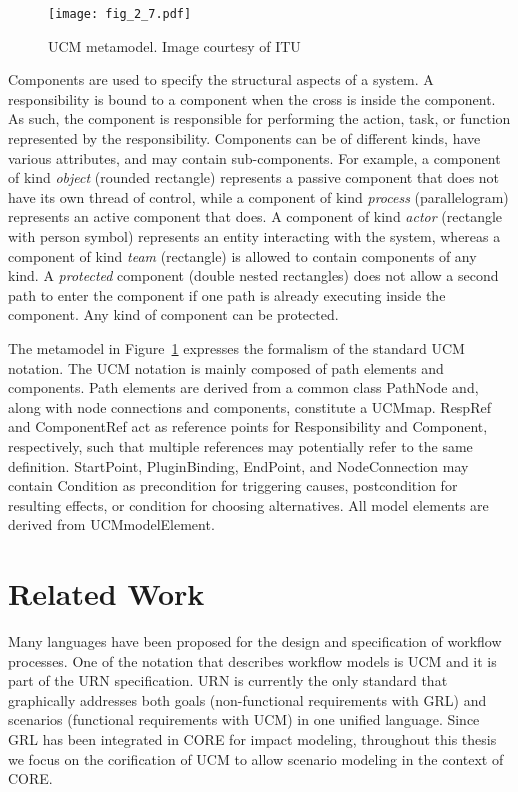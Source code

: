 \begin{figure}
	\centering
	\texttt{[image: fig\_2\_7.pdf]}
	\caption[UCM metamodel]{UCM metamodel. Image courtesy of ITU~\cite{itu2012151}}
	\label{fig:2.7}
\end{figure}

Components are used to specify the structural aspects of a system. A responsibility is bound to a component when the cross is inside the component. As such, the component is responsible for performing the action, task, or function represented by the responsibility. Components can be of different kinds, have various attributes, and may contain sub-components. For example, a component of kind \emph{object} (rounded rectangle) represents a passive component that does not have its own thread of control, while a component of kind \emph{process} (parallelogram) represents an active component that does. A component of kind \emph{actor} (rectangle with person symbol) represents an entity interacting with the system, whereas a component of kind \emph{team} (rectangle) is allowed to contain components of any kind. A \emph{protected} component (double nested rectangles) does not allow a second path to enter the component if one path is already executing inside the component. Any kind of component can be protected.

The metamodel in Figure~\ref{fig:2.7} expresses the formalism of the standard UCM notation. The UCM notation is mainly composed of path elements and components. Path elements are derived from a common class {\cls PathNode} and, along with node connections and components, constitute a {\cls UCMmap}. {\cls RespRef} and {\cls ComponentRef} act as reference points for {\cls Responsibility} and {\cls Component}, respectively, such that multiple references may potentially refer to the same definition. {\cls StartPoint}, {\cls PluginBinding}, {\cls EndPoint}, and {\cls NodeConnection} may contain {\cls Condition} as precondition for triggering causes, postcondition for resulting effects, or condition for choosing alternatives. All model elements are derived from {\cls UCMmodelElement}.

\section{Related Work} \label{sec:2.3}

Many languages have been proposed for the design and specification of workflow processes. One of the notation that describes workflow models is UCM and it is part of the URN specification. URN is currently the only standard that graphically addresses both goals (non-functional requirements with GRL) and scenarios (functional requirements with UCM) in one unified language. Since GRL has been integrated in CORE for impact modeling, throughout this thesis we focus on the corification of UCM to allow scenario modeling in the context of CORE.

